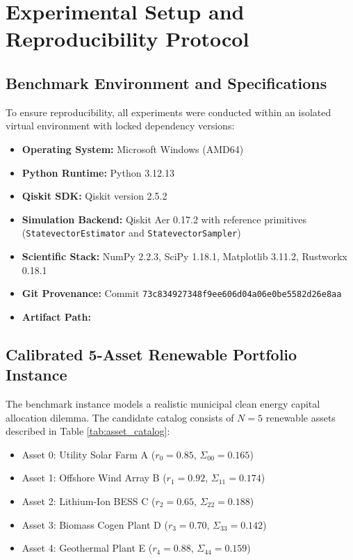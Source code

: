 \chapter{Experimental Setup and Reproducibility Protocol}
\label{chap:experimental-setup}

\section{Benchmark Environment and Specifications}
To ensure reproducibility, all experiments were conducted within an isolated virtual environment with locked dependency versions:
\begin{itemize}
    \item \textbf{Operating System:} Microsoft Windows (AMD64)
    \item \textbf{Python Runtime:} Python 3.12.13
    \item \textbf{Qiskit SDK:} Qiskit version 2.5.2
    \item \textbf{Simulation Backend:} Qiskit Aer 0.17.2 with reference primitives (\texttt{StatevectorEstimator} and \texttt{StatevectorSampler})
    \item \textbf{Scientific Stack:} NumPy 2.2.3, SciPy 1.18.1, Matplotlib 3.11.2, Rustworkx 0.18.1
    \item \textbf{Git Provenance:} Commit \texttt{73c834927348f9ee606d04a06e0be5582d26e8aa}
    \item \textbf{Artifact Path:} 
\end{itemize}

\section{Calibrated 5-Asset Renewable Portfolio Instance}
The benchmark instance models a realistic municipal clean energy capital allocation dilemma. The candidate catalog consists of $N = 5$ renewable assets described in Table \ref{tab:asset_catalog}:
\begin{itemize}
    \item Asset 0: Utility Solar Farm A ($r_0 = 0.85$, $\Sigma_{00} = 0.165$)
    \item Asset 1: Offshore Wind Array B ($r_1 = 0.92$, $\Sigma_{11} = 0.174$)
    \item Asset 2: Lithium-Ion BESS C ($r_2 = 0.65$, $\Sigma_{22} = 0.188$)
    \item Asset 3: Biomass Cogen Plant D ($r_3 = 0.70$, $\Sigma_{33} = 0.142$)
    \item Asset 4: Geothermal Plant E ($r_4 = 0.88$, $\Sigma_{44} = 0.159$)
\end{itemize}


